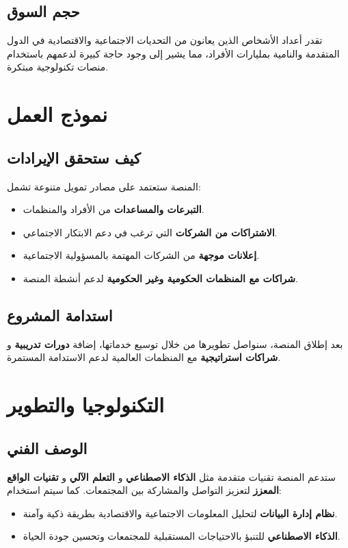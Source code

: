 \documentclass[12pt]{article}
\begin{document}
\subsection*{\textcolor{sectionColor}{حجم السوق}}
تقدر أعداد الأشخاص الذين يعانون من التحديات الاجتماعية والاقتصادية في الدول المتقدمة والنامية بمليارات الأفراد، مما يشير إلى وجود حاجة كبيرة لدعمهم باستخدام منصات تكنولوجية مبتكرة.

\section {\textcolor{sectionColor}{نموذج العمل}}
\subsection*{\textcolor{sectionColor}{كيف ستحقق الإيرادات}}
المنصة ستعتمد على مصادر تمويل متنوعة تشمل:
\begin{itemize}
    \item \textbf{التبرعات والمساعدات} من الأفراد والمنظمات.
    \item \textbf{الاشتراكات من الشركات} التي ترغب في دعم الابتكار الاجتماعي.
    \item \textbf{إعلانات موجهة} من الشركات المهتمة بالمسؤولية الاجتماعية.
    \item \textbf{شراكات مع المنظمات الحكومية وغير الحكومية} لدعم أنشطة المنصة.
\end{itemize}

\subsection*{\textcolor{sectionColor}{استدامة المشروع}}
بعد إطلاق المنصة، سنواصل تطويرها من خلال توسيع خدماتها، إضافة \textbf{دورات تدريبية} و \textbf{شراكات استراتيجية} مع المنظمات العالمية لدعم الاستدامة المستمرة.

\section{\textcolor{sectionColor}{التكنولوجيا والتطوير}}
\subsection*{\textcolor{sectionColor}{الوصف الفني}}
ستدعم المنصة تقنيات متقدمة مثل \textbf{الذكاء الاصطناعي} و \textbf{التعلم الآلي} و \textbf{تقنيات الواقع المعزز} لتعزيز التواصل والمشاركة بين المجتمعات. كما سيتم استخدام:
\begin{itemize}
    \item \textbf{نظام إدارة البيانات} لتحليل المعلومات الاجتماعية والاقتصادية بطريقة ذكية وآمنة.
    \item \textbf{الذكاء الاصطناعي} للتنبؤ بالاحتياجات المستقبلية للمجتمعات وتحسين جودة الحياة.
\end{itemize}
\end{document}
